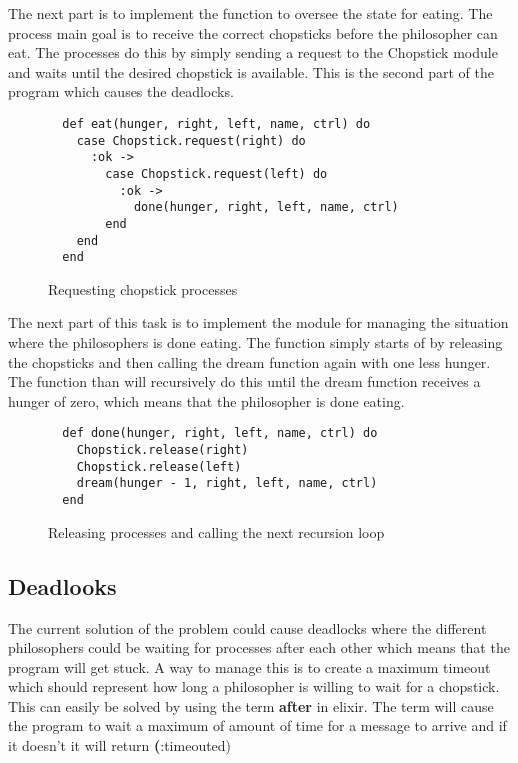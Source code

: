 \documentclass[a4paper,11pt]{article}
\begin{document}
The next part is to implement the function to oversee the state for eating. The process main goal is to receive the correct chopsticks before the philosopher can eat. The processes do this by simply sending a request to the Chopstick module and waits until the desired chopstick is available. This is the second part of the program which causes the deadlocks.

\begin{figure}[H]
\begin{verbatim}
  def eat(hunger, right, left, name, ctrl) do
    case Chopstick.request(right) do
      :ok ->
        case Chopstick.request(left) do
          :ok ->
            done(hunger, right, left, name, ctrl)
        end
    end
  end
\end{verbatim}
\caption{Requesting chopstick processes}
\label{Figure:5}
\end{figure}

The next part of this task is to implement the module for managing the situation where the philosophers is done eating. The function simply starts of by releasing the chopsticks and then calling the dream function again with one less hunger. The function than will recursively do this until the dream function receives a hunger of zero, which means that the philosopher is done eating.

\begin{figure}[H]
\begin{verbatim}
  def done(hunger, right, left, name, ctrl) do
    Chopstick.release(right)
    Chopstick.release(left)
    dream(hunger - 1, right, left, name, ctrl)
  end
\end{verbatim}
\caption{Releasing processes and calling the next recursion loop}
\label{Figure:6}
\end{figure}

\subsection*{Deadlooks}
The current solution of the problem could cause deadlocks where the different philosophers could be waiting for processes after each other which means that the program will get stuck. A way to manage this is to create a maximum timeout which should represent how long a philosopher is willing to wait for a chopstick. This can easily be solved by using the term \textbf{after} in elixir. The term will cause the program to wait a maximum of amount of time for a message to arrive and if it doesn’t it will return \textbf(:timeouted)
\end{document}
